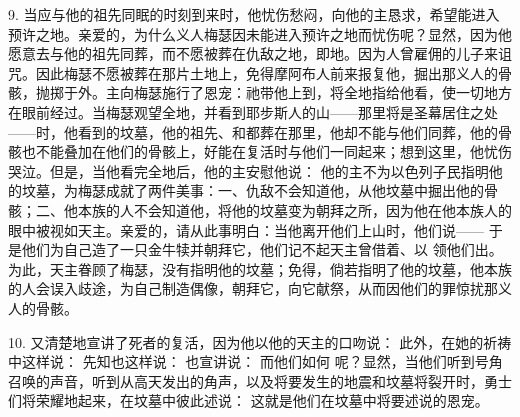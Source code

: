 9. 当应与他的祖先同眠的时刻到来时，他忧伤愁闷，向他的主恳求，希望能进入预许之地。亲爱的，为什么义人梅瑟因未能进入预许之地而忧伤呢？显然，因为他愿意去与他的祖先同葬，而不愿被葬在仇敌之地，即地。因为人曾雇佣的儿子来诅咒。因此梅瑟不愿被葬在那片土地上，免得摩阿布人前来报复他，掘出那义人的骨骸，抛掷于外。主向梅瑟施行了恩宠：祂带他上到，将全地指给他看，使一切地方在眼前经过。当梅瑟观望全地，并看到耶步斯人的山——那里将是圣幕居住之处——时，他看到的坟墓，他的祖先、和都葬在那里，他却不能与他们同葬，他的骨骸也不能叠加在他们的骨骸上，好能在复活时与他们一同起来；想到这里，他忧伤哭泣。但是，当他看完全地后，他的主安慰他说：  他的主不为以色列子民指明他的坟墓，为梅瑟成就了两件美事：一、仇敌不会知道他，从他坟墓中掘出他的骨骸；二、他本族的人不会知道他，将他的坟墓变为朝拜之所，因为他在他本族人的眼中被视如天主。亲爱的，请从此事明白：当他离开他们上山时，他们说—— 于是他们为自己造了一只金牛犊并朝拜它，他们记不起天主曾借着、以 领他们出。为此，天主眷顾了梅瑟，没有指明他的坟墓；免得，倘若指明了他的坟墓，他本族的人会误入歧途，为自己制造偶像，朝拜它，向它献祭，从而因他们的罪惊扰那义人的骨骸。\par

10. 又清楚地宣讲了死者的复活，因为他以他的天主的口吻说： 此外，在她的祈祷中这样说： 先知也这样说： 也宣讲说： 而他们如何 呢？显然，当他们听到号角召唤的声音，听到从高天发出的角声，以及将要发生的地震和坟墓将裂开时，勇士们将荣耀地起来，在坟墓中彼此述说： 这就是他们在坟墓中将要述说的恩宠。\par

